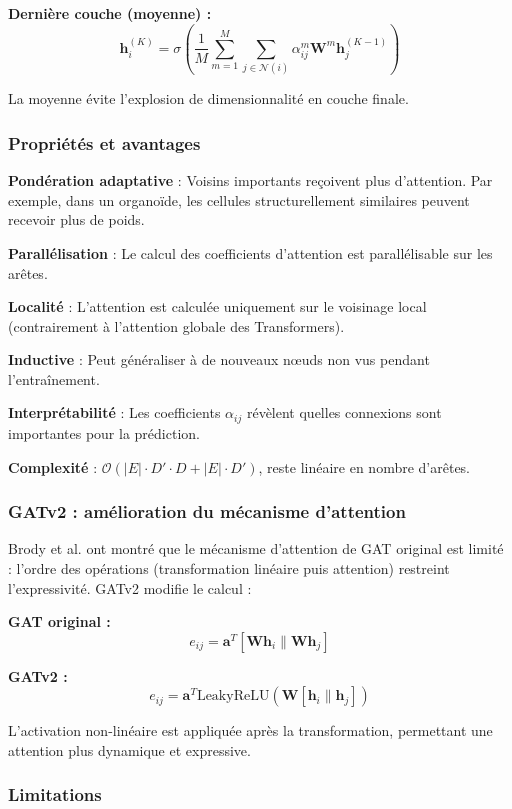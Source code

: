 \textbf{Dernière couche (moyenne) :}
\[
\mathbf{h}_i^{(K)} = \sigma\left(\frac{1}{M}\sum_{m=1}^M \sum_{j \in \mathcal{N}(i)} \alpha_{ij}^m \mathbf{W}^m\mathbf{h}_j^{(K-1)}\right)
\]

La moyenne évite l'explosion de dimensionnalité en couche finale.

\subsubsection{Propriétés et avantages}

\textbf{Pondération adaptative} : Voisins importants reçoivent plus d'attention. Par exemple, dans un organoïde, les cellules structurellement similaires peuvent recevoir plus de poids.

\textbf{Parallélisation} : Le calcul des coefficients d'attention est parallélisable sur les arêtes.

\textbf{Localité} : L'attention est calculée uniquement sur le voisinage local (contrairement à l'attention globale des Transformers).

\textbf{Inductive} : Peut généraliser à de nouveaux nœuds non vus pendant l'entraînement.

\textbf{Interprétabilité} : Les coefficients $\alpha_{ij}$ révèlent quelles connexions sont importantes pour la prédiction.

\textbf{Complexité} : $\mathcal{O}(|E| \cdot D' \cdot D + |E| \cdot D')$, reste linéaire en nombre d'arêtes.

\subsubsection{GATv2 : amélioration du mécanisme d'attention}

Brody et al. ont montré que le mécanisme d'attention de GAT original est limité : l'ordre des opérations (transformation linéaire puis attention) restreint l'expressivité. GATv2 modifie le calcul :

\textbf{GAT original :}
\[
e_{ij} = \mathbf{a}^T [\mathbf{W}\mathbf{h}_i \| \mathbf{W}\mathbf{h}_j]
\]

\textbf{GATv2 :}
\[
e_{ij} = \mathbf{a}^T \text{LeakyReLU}\left(\mathbf{W}[\mathbf{h}_i \| \mathbf{h}_j]\right)
\]

L'activation non-linéaire est appliquée après la transformation, permettant une attention plus dynamique et expressive.

\subsubsection{Limitations}

